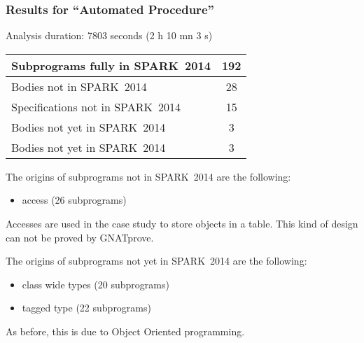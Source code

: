 \documentclass[10pt,a4paper,twocolumn]{article}
\newcommand{\gnatprove}{GNATprove\xspace}
\newcommand{\newspark}{SPARK~2014\xspace}
\begin{document}
\subsubsection{Results for ``Automated Procedure''}

Analysis duration: 7803 seconds (2 h 10 mn 3 s)

\vspace{5mm}

\begin{tabular}{|l|c|}
\hline
Subprograms fully in \newspark  &  192 \\
\hline
Bodies not in \newspark         &   28 \\
\hline
Specifications not in \newspark &   15 \\
\hline
Bodies not yet in \newspark     &    3 \\
\hline
Bodies not yet in \newspark     &    3 \\
\hline
\end{tabular}

\vspace{5mm}

The origins of subprograms not in \newspark are the following:

\begin{itemize}
\item access (26 subprograms)
\end{itemize}

Accesses are used in the case study to store objects in a table.
This kind of design can not be proved by \gnatprove.

The origins of subprograms not yet in \newspark are the following:

\begin{itemize}
\item class wide types (20 subprograms)
\item tagged type (22 subprograms)
\end{itemize}

As before, this is due to Object Oriented programming.

\vspace{5mm}
\end{document}
